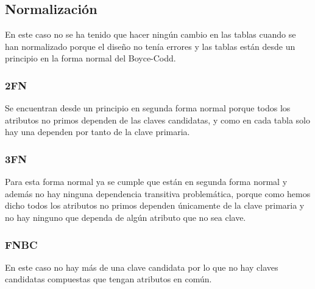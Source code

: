 \subsection{Normalización}
En este caso no se ha tenido que hacer ningún cambio en las tablas cuando se han normalizado porque el diseño
no tenía errores y las tablas están desde un principio en la forma normal del Boyce-Codd.

\subsubsection{2FN}
Se encuentran desde un principio en segunda forma normal porque todos los atributos no primos dependen de las claves candidatas,
y como en cada tabla solo hay una dependen por tanto de la clave primaria.

\subsubsection{3FN}
Para esta forma normal ya se cumple que están en segunda forma normal y además no hay ninguna dependencia transitiva problemática,
porque como hemos dicho todos los atributos no primos dependen únicamente de la clave primaria y no hay ninguno que dependa de algún
atributo que no sea clave.

\subsubsection{FNBC}
En este caso no hay más de una clave candidata por lo que no hay claves candidatas compuestas que tengan atributos en común.
